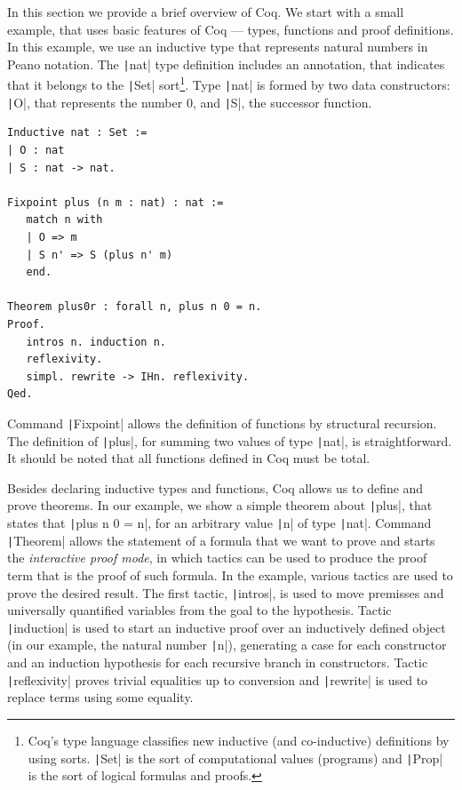\documentclass[review]{elsarticle}
\newcommand{\coq}[1]{\texttt|#1|}
\theoremstyle{definition}
\begin{document}
In this section we provide a brief overview of Coq. We start with a
small example, that uses basic
features of Coq --- types, functions and proof definitions.  In this
example, we use an inductive type that represents natural numbers in
Peano notation. The \coq{nat} type definition includes an
annotation, that indicates that it belongs to the \coq{Set}
sort\footnote{Coq's type language classifies new inductive (and
  co-inductive) definitions by using sorts. \coq{Set} is the sort
  of computational values (programs) and \coq{Prop} is the sort of
  logical formulas and proofs.}. Type \coq{nat} is formed by two
data constructors: \coq{O}, that represents the number $0$, and \coq{S},
the successor function.
\begin{verbatim}
Inductive nat : Set :=
| O : nat
| S : nat -> nat.

Fixpoint plus (n m : nat) : nat :=
   match n with
   | O => m
   | S n' => S (plus n' m)
   end.

Theorem plus0r : forall n, plus n 0 = n.
Proof.
   intros n. induction n.
   reflexivity.
   simpl. rewrite -> IHn. reflexivity.
Qed.
\end{verbatim}   

Command \coq{Fixpoint} allows the definition of functions by
structural recursion. The definition of \coq{plus}, for summing two
values of type \coq{nat}, is straightforward. It should be noted
that all functions defined in Coq must be total.

Besides declaring inductive types and functions, Coq allows us to
define and prove theorems. In our example, we show a simple theorem
about \coq{plus}, that states that
\coq{plus n 0 = n}, for an arbitrary value \coq{n} of type
\coq{nat}. Command \coq{Theorem} allows the statement of a
formula that we want to prove and starts the \emph{interactive proof mode}, 
in which tactics can be used to produce the proof term that
is the proof of such formula. In the example, various tactics are
used to prove the desired result.  The first tactic, \coq{intros}, is
used to move premisses and universally quantified variables from the
goal to the hypothesis. Tactic \coq{induction} is used to start an inductive
proof over an inductively defined object (in our example,
the natural number \coq{n}), generating a case for each constructor and
an induction hypothesis for each recursive branch in constructors.
Tactic \coq{reflexivity} proves trivial equalities up to conversion and
\coq{rewrite} is used to replace terms using some equality. 
\end{document}
